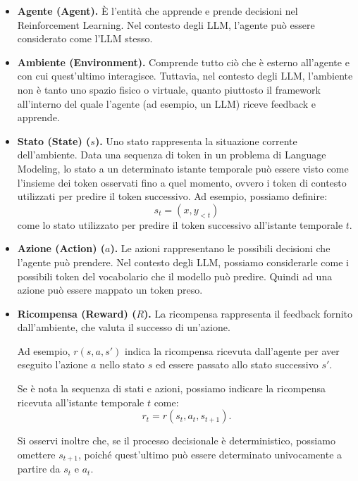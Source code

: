 \begin{itemize}
    \item \textbf{Agente (Agent).} 
    È l'entità che apprende e prende decisioni nel Reinforcement 
    Learning. Nel contesto degli LLM, l'agente può essere 
    considerato come l'LLM stesso.

    \item \textbf{Ambiente (Environment).} 
    Comprende tutto ciò che è esterno all'agente e con cui 
    quest'ultimo interagisce.
    Tuttavia, nel contesto degli LLM, l'ambiente non è tanto 
    uno spazio fisico o virtuale, quanto piuttosto il framework 
    all'interno del quale l'agente (ad esempio, un LLM) 
    riceve feedback e apprende.

    \item \textbf{Stato (State) ($s$).} 
    Uno stato rappresenta la situazione corrente dell'ambiente.
    Data una sequenza di token in un problema di Language Modeling, 
    lo stato a un determinato istante temporale può essere visto 
    come l'insieme dei token osservati fino a quel momento, 
    ovvero i token di contesto utilizzati per predire il token 
    successivo.
    Ad esempio, possiamo definire:
    \[
        s_t = (x,y_{<t})
    \]
    come lo stato utilizzato per predire il token successivo 
    all'istante temporale $t$.

    \item \textbf{Azione (Action) ($a$).} 
    Le azioni rappresentano le possibili decisioni che l'agente 
    può prendere.
    Nel contesto degli LLM, possiamo considerarle come i 
    possibili token del vocabolario che il modello può predire.
    Quindi ad una azione può essere mappato un token preso.

    \item \textbf{Ricompensa (Reward) ($R$).} 
    La ricompensa rappresenta il feedback fornito dall'ambiente, 
    che valuta il successo di un'azione.

    Ad esempio, $r(s,a,s')$ indica la ricompensa ricevuta 
    dall'agente per aver eseguito l'azione $a$ nello stato $s$ 
    ed essere passato allo stato successivo $s'$.

    Se è nota la sequenza di stati e azioni, possiamo indicare 
    la ricompensa ricevuta all'istante temporale $t$ come:
    \[
        r_t = r(s_t,a_t,s_{t+1}).
    \]

    Si osservi inoltre che, se il processo decisionale è 
    deterministico, possiamo omettere $s_{t+1}$, poiché 
    quest'ultimo può essere determinato univocamente a partire 
    da $s_t$ e $a_t$.


\end{itemize}
